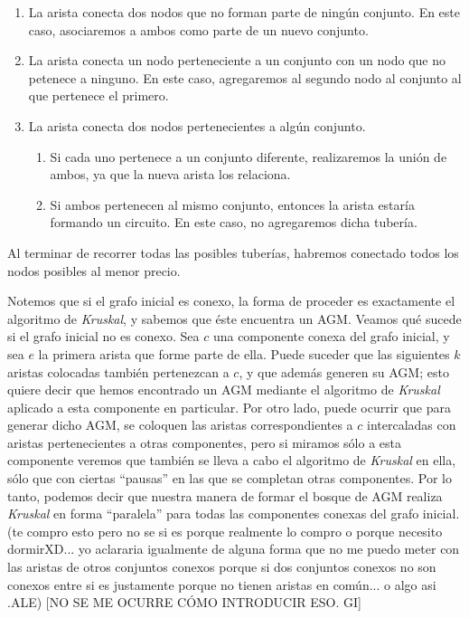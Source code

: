 \begin{enumerate}
	\item La arista conecta dos nodos que no forman parte de ningún conjunto.  En este caso, asociaremos a ambos como parte de un nuevo conjunto.
	\item La arista conecta un nodo perteneciente a un conjunto con un nodo que no petenece a ninguno.  En este caso, agregaremos al segundo nodo al conjunto al que pertenece el primero.
	\item La arista conecta dos nodos pertenecientes a algún conjunto.
	
	\begin{enumerate}
		\item Si cada uno pertenece a un conjunto diferente, realizaremos la unión de ambos, ya que la nueva arista los relaciona.
		\item Si ambos pertenecen al mismo conjunto, entonces la arista estaría formando un circuito.  En este caso, no agregaremos dicha tubería.
	\end{enumerate}
\end{enumerate}

Al terminar de recorrer todas las posibles tuberías, habremos conectado todos los nodos posibles al menor precio.

Notemos que si el grafo inicial es conexo, la forma de proceder es exactamente el algoritmo de {\it Kruskal}, y sabemos que éste encuentra un AGM.  Veamos qué sucede si el grafo inicial no es conexo.  Sea $c$ una componente conexa del grafo inicial, y sea $e$ la primera arista que forme parte de ella.  Puede suceder que las siguientes $k$ aristas colocadas también pertenezcan a $c$, y que además generen su AGM; esto quiere decir que hemos encontrado un AGM mediante el algoritmo de {\it Kruskal} aplicado a esta componente en particular.  Por otro lado, puede ocurrir que para generar dicho AGM, se coloquen las aristas correspondientes a $c$ intercaladas con aristas pertenecientes a otras componentes, pero si miramos sólo a esta componente veremos que también se lleva a cabo el algoritmo de {\it Kruskal} en ella, sólo que con ciertas ``pausas'' en las que se completan otras componentes.  Por lo tanto, podemos decir que nuestra manera de formar el bosque de AGM realiza {\it Kruskal} en forma ``paralela'' para todas las componentes conexas del grafo inicial.
(te compro esto pero no se si es porque realmente lo compro o porque necesito dormirXD... yo aclararia igualmente de alguna forma que no me puedo meter con las aristas de otros conjuntos conexos porque si dos conjuntos conexos no son conexos entre si es justamente porque no tienen aristas en común... o algo asi .ALE)
[NO SE ME OCURRE CÓMO INTRODUCIR ESO. GI]

